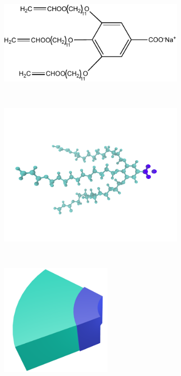 \documentclass{article}
\begin{document}
  \begin{figure}[!htb]
      \centering
      \begin{subfigure}{.3\textwidth}
              \centering
              \includegraphics[width=\textwidth]{NaGA3C11.pdf}
              \caption{}~\label{fig:monomer}
      \end{subfigure}
      \begin{subfigure}{.3\textwidth}
              \centering
              \includegraphics[width=\textwidth]{monomer_twocolor.pdf}
              \caption{}~\label{fig:atomistic_monomer}
      \end{subfigure}
      \begin{subfigure}{0.3\linewidth}
              \centering
              \includegraphics[width=0.6\textwidth]{wedge_thick.pdf}

\end{subfigure}
\end{figure}
\end{document}
